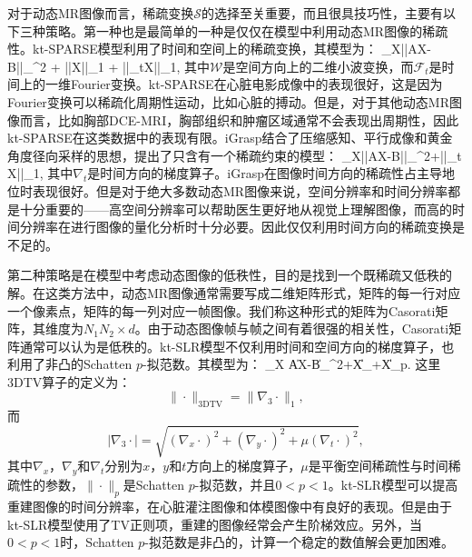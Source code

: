 对于动态MR图像而言，稀疏变换$\mathcal{S}$的选择至关重要，而且很具技巧性，主要有以下三种策略。第一种也是最简单的一种是仅仅在模型中利用动态MR图像的稀疏性。kt-SPARSE\cite{lustig2006}模型利用了时间和空间上的稀疏变换，其模型为：
\beq
\min_X||AX-B||_{}^2 + \alpha||X||_1 + \beta||_tX||_1,
\eeq
其中$\mathcal{W}$是空间方向上的二维小波变换，而$\mathcal{F}_t$是时间上的一维Fourier变换。kt-SPARSE在心脏电影成像中的表现很好，这是因为Fourier变换可以稀疏化周期性运动，比如心脏的搏动。但是，对于其他动态MR图像而言，比如胸部DCE-MRI，胸部组织和肿瘤区域通常不会表现出周期性，因此kt-SPARSE在这类数据中的表现有限。iGrasp\cite{igrasp}结合了压缩感知、平行成像和黄金角度径向采样的思想，提出了只含有一个稀疏约束的模型：
\beq
\min_X||AX-B||_{}^2+\alpha||\nabla_t X||_1,
\eeq
其中$\nabla_t$是时间方向的梯度算子。iGrasp在图像时间方向的稀疏性占主导地位时表现很好。但是对于绝大多数动态MR图像来说，空间分辨率和时间分辨率都是十分重要的——高空间分辨率可以帮助医生更好地从视觉上理解图像，而高的时间分辨率在进行图像的量化分析时十分必要。因此仅仅利用时间方向的稀疏变换是不足的。

第二种策略是在模型中考虑动态图像的低秩性，目的是找到一个既稀疏又低秩的解。在这类方法中，动态MR图像通常需要写成二维矩阵形式，矩阵的每一行对应一个像素点，矩阵的每一列对应一帧图像。我们称这种形式的矩阵为Casorati矩阵，其维度为$N_1N_2\times d$。由于动态图像帧与帧之间有着很强的相关性，Casorati矩阵通常可以认为是低秩的。kt-SLR模型\cite{Sajan2011Accelerated}不仅利用时间和空间方向的梯度算子，也利用了非凸的Schatten $p$-拟范数。其模型为：
\beq
\min_X \|AX-B\|_{}^2+\alpha\|X\|_{}+\beta\|X\|_{p}.
\eeq
这里3DTV算子的定义为：
$$
\|\cdot\|_{\mathrm{3DTV}}=\|\nabla_3\cdot\|_1,
$$
而
$$
|\nabla_3\cdot| = \sqrt{(\nabla_x\cdot)^2+(\nabla_y\cdot)^2+\mu(\nabla_t\cdot)^2},
$$
其中$\nabla_x$，$\nabla_y$和$\nabla_t$分别为$x$，$y$和$t$方向上的梯度算子，$\mu$是平衡空间稀疏性与时间稀疏性的参数，$\|\cdot\|_{p}$是Schatten $p$-拟范数，并且$0<p<1$。kt-SLR模型可以提高重建图像的时间分辨率，在心脏灌注图像和体模图像中有良好的表现。但是由于kt-SLR模型使用了TV正则项，重建的图像经常会产生阶梯效应。另外，当$0<p<1$时，Schatten $p$-拟范数是非凸的，计算一个稳定的数值解会更加困难。

